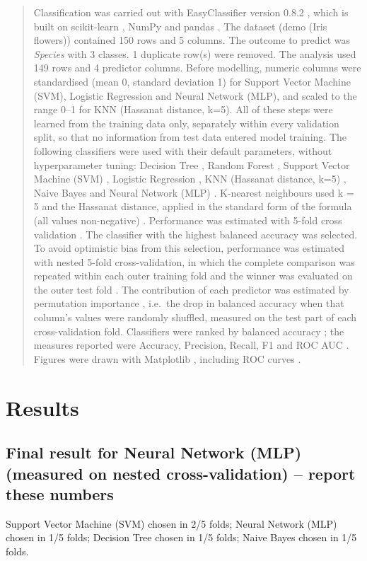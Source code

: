 \documentclass[11pt,a4paper]{article}
\begin{document}
\begin{quote}
Classification was carried out with EasyClassifier version 0.8.2 \cite{easyclassifier}, which is built on scikit-learn \cite{sklearn}, NumPy \cite{numpy} and pandas \cite{pandas}. The dataset (demo (Iris flowers)) contained 150 rows and 5 columns. The outcome to predict was \emph{Species} with 3 classes. 1 duplicate row(s) were removed. The analysis used 149 rows and 4 predictor columns. Before modelling, numeric columns were standardised (mean 0, standard deviation 1) for Support Vector Machine (SVM), Logistic Regression and Neural Network (MLP), and scaled to the range 0--1 for KNN (Hassanat distance, k=5). All of these steps were learned from the training data only, separately within every validation split, so that no information from test data entered model training. The following classifiers were used with their default parameters, without hyperparameter tuning: Decision Tree \cite{breiman1984}, Random Forest \cite{breiman2001}, Support Vector Machine (SVM) \cite{cortes1995,platt1999}, Logistic Regression \cite{cox1958}, KNN (Hassanat distance, k=5) \cite{cover1967}, Naive Bayes \cite{hand2001} and Neural Network (MLP) \cite{rumelhart1986,kingma2015}. K-nearest neighbours used k = 5 and the Hassanat distance, applied in the standard form of the formula (all values non-negative) \cite{hassanat2022,hassanat2014}. Performance was estimated with 5-fold cross validation \cite{kohavi1995}. The classifier with the highest balanced accuracy was selected. To avoid optimistic bias from this selection, performance was estimated with nested 5-fold cross-validation, in which the complete comparison was repeated within each outer training fold and the winner was evaluated on the outer test fold \cite{varma2006,cawley2010}. The contribution of each predictor was estimated by permutation importance \cite{breiman2001}, i.e.\ the drop in balanced accuracy when that column's values were randomly shuffled, measured on the test part of each cross-validation fold. Classifiers were ranked by balanced accuracy \cite{brodersen2010}; the measures reported were Accuracy, Precision, Recall, F1 and ROC AUC \cite{fawcett2006}. Figures were drawn with Matplotlib \cite{matplotlib}, including ROC curves \cite{fawcett2006}.
\end{quote}
\section{Results}
\subsection*{Final result for Neural Network (MLP) (measured on nested cross-validation) -- report these numbers}
Support Vector Machine (SVM) chosen in 2/5 folds; Neural Network (MLP) chosen in 1/5 folds; Decision Tree chosen in 1/5 folds; Naive Bayes chosen in 1/5 folds.
\end{document}
